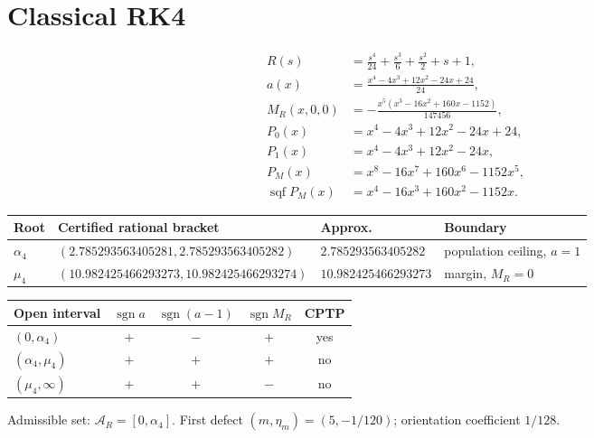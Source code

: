 \documentclass[11pt]{article}
\begin{document}
\section{Classical RK4}
\begin{align*}
R(s)&=\frac{s^{4}}{24} + \frac{s^{3}}{6} + \frac{s^{2}}{2} + s + 1,\\
a(x)&=\frac{x^{4} - 4 x^{3} + 12 x^{2} - 24 x + 24}{24},\\
M_R(x,0,0)&=- \frac{x^{5} \left(x^{3} - 16 x^{2} + 160 x - 1152\right)}{147456},\\
P_0(x)&=x^{4}-4 x^{3}+12 x^{2}-24 x+24,\\
P_1(x)&=x^{4}-4 x^{3}+12 x^{2}-24 x,\\
P_M(x)&=x^{8}-16 x^{7}+160 x^{6}-1152 x^{5},\\
\operatorname{sqf}P_M(x)&=x^{4}-16 x^{3}+160 x^{2}-1152 x.
\end{align*}
\begin{center}
\begin{tabular}{@{}llll@{}}
\toprule
Root & Certified rational bracket & Approx. & Boundary \\
\midrule
$\alpha_4$ & $(2.785293563405281,2.785293563405282)$ & $2.785293563405282$ & population ceiling, $a=1$ \\
$\mu_4$ & $(10.982425466293273,10.982425466293274)$ & $10.982425466293273$ & margin, $M_R=0$ \\
\bottomrule
\end{tabular}
\end{center}
\begin{center}
\begin{tabular}{@{}lcccc@{}}
\toprule
Open interval & $\operatorname{sgn}a$ & $\operatorname{sgn}(a-1)$ & $\operatorname{sgn}M_R$ & CPTP \\
\midrule
$(0,\alpha_4)$ & $+$ & $-$ & $+$ & yes \\
$(\alpha_4,\mu_4)$ & $+$ & $+$ & $+$ & no \\
$(\mu_4,\infty)$ & $+$ & $+$ & $-$ & no \\
\bottomrule
\end{tabular}
\end{center}
Admissible set: $\mathcal A_R=[0,\alpha_4]$. First defect $(m,\eta_m)=(5,-1/120)$; orientation coefficient $1/128$.
\end{document}
